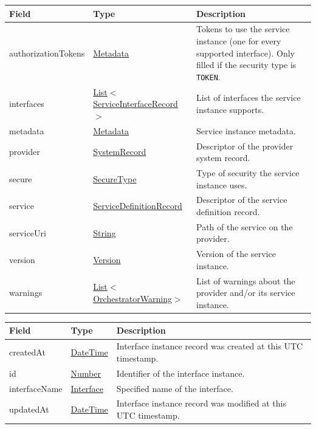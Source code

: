 \documentclass[a4paper]{arrowhead}
\newcommand{\pref}[1]{{\textcolor{ArrowheadGrey}{\hyperref[sec:model:primitives:#1]{#1}}}}
\begin{document}
\clearpage

\label{sec:model:OrchestrationResult}

\begin{table}[ht!]
\begin{tabularx}{\textwidth}{| p{4cm} | p{4.6cm} | X |} \hline
\rowcolor{gray!33} Field & Type & Description \\ \hline
authorizationTokens & \hyperref[sec:model:Metadata]{Metadata} & Tokens to use the service instance (one for every supported interface). Only filled if the security type is \texttt{TOKEN}. \\ \hline
interfaces & \pref{List}$<$\hyperref[sec:model:ServiceInterfaceRecord]{ServiceInterfaceRecord}$>$ & List of interfaces the service instance supports. \\ \hline
metadata & \hyperref[sec:model:Metadata]{Metadata} & Service instance metadata. \\ \hline
provider & \hyperref[sec:model:SystemRecord]{SystemRecord} & Descriptor of the provider system record. \\ \hline
secure & \pref{SecureType} & Type of security the service instance uses. \\ \hline
service & \hyperref[sec:model:ServiceDefinitionRecord]{ServiceDefinitionRecord} & Descriptor of the service definition record. \\ \hline
serviceUri & \pref{String} & Path of the service on the provider. \\ \hline
version & \pref{Version} & Version of the service instance. \\ \hline
warnings & \pref{List}$<$\pref{OrchestratorWarning}$>$ & List of warnings about the provider and/or its service instance. \\ \hline
\end{tabularx}
\end{table}

\label{sec:model:ServiceInterfaceRecord}

\begin{table}[ht!]
\begin{tabularx}{\textwidth}{| p{4.25cm} | p{3.5cm} | X |} \hline
\rowcolor{gray!33} Field & Type & Description \\ \hline
createdAt & \pref{DateTime} & Interface instance record was created at this UTC time\-stamp. \\ \hline
id & \pref{Number} & Identifier of the interface instance. \\ \hline
interfaceName &\pref{Interface} & Specified name of the interface. \\ \hline
updatedAt & \pref{DateTime} & Interface instance record was modified at this UTC time\-stamp. \\ \hline
\end{tabularx}
\end{table}
\end{document}
